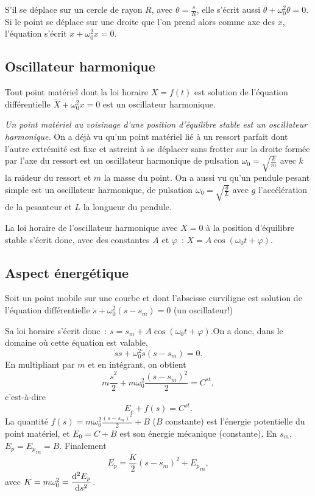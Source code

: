 S'il se déplace sur un cercle de rayon \(R\), avec \(\theta=\frac{s}{R}\), elle
s'écrit aussi \(\ddot{\theta}+\omega_0^2\theta=0\). Si le point se déplace sur
une droite que l'on prend alors comme axe des \(x\), l'équation s'écrit
\(\ddot{x}+\omega_0^2x = 0\).

\subsection{Oscillateur harmonique}%
\label{chap5-subsec:oscillateur}%

Tout point matériel dont la loi horaire \(X=f(t)\) est solution de l'équation
différentielle \(\ddot{X}+\omega_0^2x=0\) est un oscillateur harmonique.

\emph{Un point matériel au voisinage d'une position d'équilibre stable est un
oscillateur harmonique.} On a déjà vu qu'un point matériel lié à un ressort
parfait dont l'autre extrémité est fixe et astreint à se déplacer sans frotter
sur la droite formée par l'axe du ressort est un oscillateur harmonique de
pulsation \(\omega_0=\sqrt{\frac{k}{m}}\) avec \(k\) la raideur du ressort et
\(m\) la masse du point. On a aussi vu qu'un pendule pesant simple est un
oscillateur harmonique, de pulsation \(\omega_0=\sqrt{\frac{g}{L}}\) avec \(g\)
l'accélération de la pesanteur et \(L\) la longueur du pendule.%

La loi horaire de l'oscillateur harmonique avec \(X=0\) à la position
d'équilibre stable s'écrit donc, avec des constantes \(A\) et \(\varphi\)~:
\(X=A\cos(\omega_0 t +\varphi)\).

\subsection{Aspect énergétique}%
\label{chap5-subsec:aspectenergetique}%

Soit un point mobile sur une courbe et dont l'abscisse curviligne est solution
de l'équation différentielle \(\ddot{s} +\omega_0^2(s-s_m)=0\) (un oscillateur!)

Sa loi horaire s'écrit donc~: \(s=s_m + A\cos(\omega_0 t+\varphi)\).On a donc,
dans le domaine où cette équation est valable,
\begin{equation}%
 \dot{s}\ddot{s} +\omega_0^2\dot{s}(s-s_m)=0.
\end{equation}%
En multipliant par \(m\) et en intégrant, on obtient
\begin{equation}%
  m \frac{\dot{s}^2}{2} + m\omega_0^2\frac{(s-s_m)^2}{2} = C^{st},
\end{equation}%
c'est-à-dire
\begin{equation}%
  E_c +f(s) = C^{st}.
\end{equation}%
La quantité \(f(s)=m\omega_0^2\frac{(s-s_m)^2}{2}+B\) (\(B\) constante) est
l'énergie potentielle du point matériel, et \(E_0=C+B\) est son énergie
mécanique (constante). En \(s_m\), \(E_p={E_p}_m=B\). Finalement
\begin{equation}%
  E_p = \frac{K}{2}(s-s_m)^2+{E_p}_m ,
\end{equation}%
avec \(K=m\omega_0^2=\dfrac{\mathrm{d}^2 E_p}{\mathrm{d} {s}^2}\).

